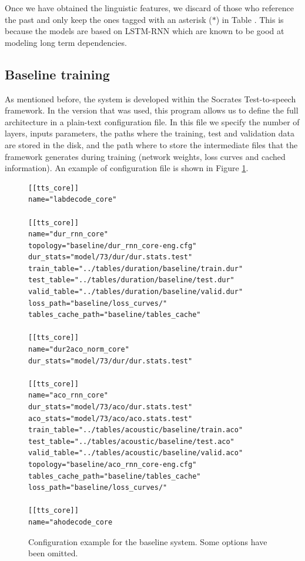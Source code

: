 Once we have obtained the linguistic features, we discard of those who reference the past and only keep the ones tagged with an asterisk ($*$) in Table \cite{tab:lab-format}. This is because the models are based on LSTM-RNN which are known to be good at modeling long term dependencies\cite{hochreiter1997long}.

\subsection{Baseline training}

As mentioned before, the system is developed within the Socrates Test-to-speech framework. In the version that was used, this program allows us to define the full architecture in a plain-text configuration file. In this file we specify the number of layers, inputs parameters, the paths where the training, test and validation data are stored in the disk, and the path where to store the intermediate files that the framework generates during training (network weights, loss curves and cached information). An example of configuration file is shown in Figure \ref{fig:soc-conf}.

\begin{figure}[h]
    \begin{lstlisting}[basicstyle=\small,frame=single]
[[tts_core]]                                       
name="labdecode_core"

[[tts_core]]                                       
name="dur_rnn_core"                                
topology="baseline/dur_rnn_core-eng.cfg"           
dur_stats="model/73/dur/dur.stats.test"            
train_table="../tables/duration/baseline/train.dur"
test_table="../tables/duration/baseline/test.dur"  
valid_table="../tables/duration/baseline/valid.dur"
loss_path="baseline/loss_curves/"                  
tables_cache_path="baseline/tables_cache"          
                                                   
[[tts_core]]                                       
name="dur2aco_norm_core"                           
dur_stats="model/73/dur/dur.stats.test"

[[tts_core]]
name="aco_rnn_core"
dur_stats="model/73/aco/dur.stats.test"
aco_stats="model/73/aco/aco.stats.test"
train_table="../tables/acoustic/baseline/train.aco"
test_table="../tables/acoustic/baseline/test.aco"
valid_table="../tables/acoustic/baseline/valid.aco"
topology="baseline/aco_rnn_core-eng.cfg"
tables_cache_path="baseline/tables_cache"
loss_path="baseline/loss_curves/"

[[tts_core]]
name="ahodecode_core
    \end{lstlisting}
    \label{fig:soc-conf}
    \caption{Configuration example for the baseline system. Some options have been omitted.}
\end{figure}

